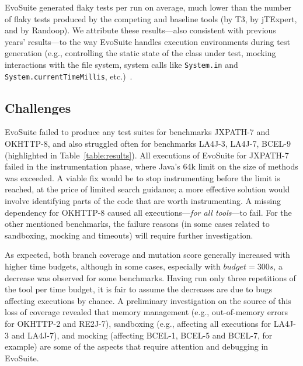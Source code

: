 \documentclass[10pt,conference]{IEEEtran}
\newcommand{\EVOSUITE}{{\sc EvoSuite}\xspace}
\newcommand{\JTEXPERT}{{\sc jTExpert}\xspace}
\newcommand{\RANDOOP}{{\sc Randoop}\xspace}
\newcommand{\TT}{{\sc T3}\xspace}
\begin{document}


\EVOSUITE generated \FlakyEvosuite flaky tests per run on average,
much lower than the number of flaky tests produced by the competing
and baseline tools (\FlakyTthree by \TT, \FlakyJtexpert by \JTEXPERT,
and \FlakyRandoop by \RANDOOP). We attribute these results---also
consistent with previous years' results---to the way \EVOSUITE handles
execution environments during test generation (e.g., controlling the
static state of the class under test, mocking interactions with the
file system, system calls like \texttt{System.in} and
\texttt{System.currentTimeMillis}, etc.)~\cite{arcuri2014automated}.


\subsection{Challenges}

\EVOSUITE failed to produce any test suites for benchmarks JXPATH-7 and
OKHTTP-8, and also struggled often for benchmarks LA4J-3, LA4J-7,
BCEL-9 (highlighted in Table~\ref{table:results}). All executions of
\EVOSUITE for JXPATH-7 failed in the instrumentation phase, where
Java's 64k limit on the size of methods was exceeded. A viable fix
would be to stop instrumenting before the limit is reached, at the
price of limited search guidance; a more effective solution would
involve identifying parts of the code that are worth instrumenting. A
missing dependency for OKHTTP-8 caused all executions---\emph{for all
  tools}---to fail. For the other mentioned benchmarks, the failure
reasons (in some cases related to sandboxing, mocking and timeouts)
will require further investigation.

As expected, both branch coverage and mutation score generally
increased with higher time budgets, although in some cases, especially
with $budget=300s$, a decrease was observed for some
benchmarks. Having run only three repetitions of the tool per time
budget, it is fair to assume the decreases are due to bugs affecting
executions by chance. A preliminary investigation on the source of
this loss of coverage revealed that memory management (e.g.,
out-of-memory errors for OKHTTP-2 and RE2J-7), sandboxing (e.g.,
affecting all executions for LA4J-3 and LA4J-7), and mocking
(affecting BCEL-1, BCEL-5 and BCEL-7, for example) are some of the
aspects that require attention and debugging in \EVOSUITE.
\end{document}
